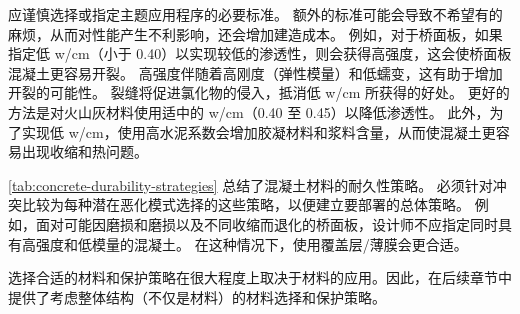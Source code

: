 应谨慎选择或指定主题应用程序的必要标准。 额外的标准可能会导致不希望有的麻烦，从而对性能产生不利影响，还会增加建造成本。 例如，对于桥面板，如果指定低 w/cm（小于 0.40）以实现较低的渗透性，则会获得高强度，这会使桥面板混凝土更容易开裂。 高强度伴随着高刚度（弹性模量）和低蠕变，这有助于增加开裂的可能性。 裂缝将促进氯化物的侵入，抵消低 w/cm 所获得的好处。 更好的方法是对火山灰材料使用适中的 w/cm（0.40 至 0.45）以降低渗透性。 此外，为了实现低 w/cm，使用高水泥系数会增加胶凝材料和浆料含量，从而使混凝土更容易出现收缩和热问题。

\cref{tab:concrete-durability-strategies} 总结了混凝土材料的耐久性策略。 必须针对冲突比较为每种潜在恶化模式选择的这些策略，以便建立要部署的总体策略。 例如，面对可能因磨损和磨损以及不同收缩而退化的桥面板，设计师不应指定同时具有高强度和低模量的混凝土。 在这种情况下，使用覆盖层/薄膜会更合适。

选择合适的材料和保护策略在很大程度上取决于材料的应用。因此，在后续章节中提供了考虑整体结构（不仅是材料）的材料选择和保护策略。

